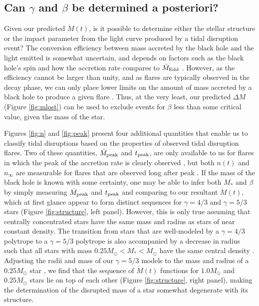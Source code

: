 \documentclass[twocolumn]{emulateapj}
\newcommand{\md}{\dot{M}\left(t\right)}
\newcommand{\mdpeak}{\dot{M}_{\rm peak}}
\newcommand{\tpeak}{t_{\rm peak}}
\newcommand{\ninf}{n_{\infty}}
\begin{document}
\subsection{Can $\gamma$ and $\beta$ be determined a posteriori?}\label{sec:aposteriori}

Given our predicted $\md$, is it possible to determine either the stellar structure or the impact parameter from the light curve produced by a tidal disruption event? The conversion efficiency between mass accreted by the black hole and the light emitted is somewhat uncertain, and depends on factors such as the black hole's spin and how the accretion rate compares to $\dot{M}_{\rm Edd}$ \citep{Ulmer:1999jja,Beloborodov:1999wb,Strubbe:2009ek,Lodato:2010ic}. However, as the efficiency cannot be larger than unity, and as flares are typically observed in the decay phase, we can only place lower limits on the amount of mass accreted by a black hole to produce a given flare \citep{Gezari:2008iv}. Thus, at the very least, our predicted $\Delta M$ (Figure \ref{fig:mlost}) can be used to exclude events for $\beta$ less than some critical value, given the mass of the star.

Figures \ref{fig:n} and \ref{fig:peak} present four additional quantities that enable us to classify tidal disruptions based on the properties of observed tidal disruption flares. Two of these quantities, $\mdpeak$ and $\tpeak$, are only available to us for flares in which the peak of the accretion rate is clearly observed \citep{Gezari:2012fk}, but both $n(t)$ and $\ninf$ are measurable for flares that are observed long after peak \citep{Komossa:1999uy,Komossa:2004dr,Gezari:2006gd,Gezari:2008iv,Cappelluti:2009jl,vanVelzen:2011gz,Cenko:2012fg}. If the mass of the black hole is known with some certainty, one may be able to infer both $M_{\ast}$ and $\beta$ by simply measuring $\mdpeak$ and $\tpeak$ and comparing to our resultant $\md$, which at first glance appear to form distinct sequences for $\gamma = 4/3$ and $\gamma = 5/3$ stars (Figure \ref{fig:structure}, left panel). However, this is only true assuming that centrally concentrated stars have the same mass and radius as stars of near constant density. The transition from stars that are well-modeled by a $\gamma = 4/3$ polytrope to a $\gamma = 5/3$ polytrope is also accompanied by a decrease in radius such that all stars with mass $0.25 M_\odot < M_\ast < M_\odot$ have the same central density \citep{Kippenhahn:1990tm}. Adjusting the radii and mass of our $\gamma = 5/3$ models to the mass and radius of a $0.25 M_\odot$ star \citep{Tout:1996waa}, we find that the sequence of $\md$ functions for $1.0 M_\odot$ and $0.25 M_\odot$ stars lie on top of each other (Figure \ref{fig:structure}, right panel), making the determination of the disrupted mass of a star somewhat degenerate with its structure.
\end{document}
